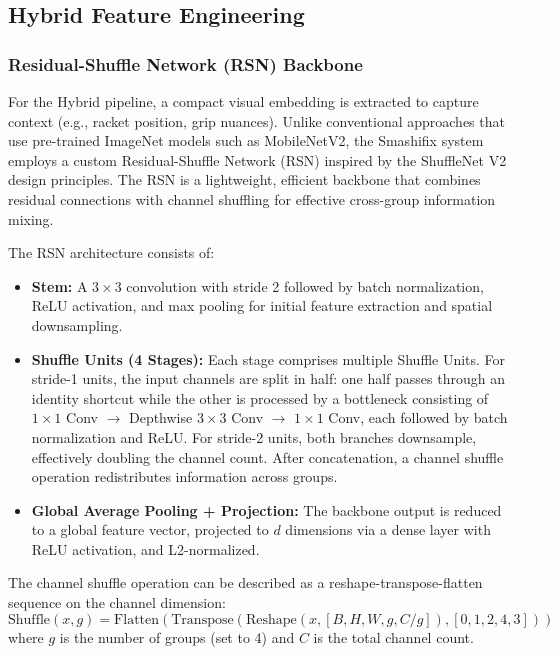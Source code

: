 \documentclass[pdflatex,sn-mathphys-num]{sn-jnl}%
\theoremstyle{thmstyleone}%
\theoremstyle{thmstyletwo}%
\theoremstyle{thmstylethree}%
\begin{document}
\subsection{Hybrid Feature Engineering}

\subsubsection{Residual-Shuffle Network (RSN) Backbone}
For the Hybrid pipeline, a compact visual embedding is extracted to capture context (e.g., racket position, grip nuances). Unlike conventional approaches that use pre-trained ImageNet models such as MobileNetV2, the Smashifix system employs a custom Residual-Shuffle Network (RSN) inspired by the ShuffleNet V2 \cite{b24} design principles. The RSN is a lightweight, efficient backbone that combines residual connections with channel shuffling for effective cross-group information mixing.

The RSN architecture consists of:
\begin{itemize}
    \item \textbf{Stem:} A $3 \times 3$ convolution with stride 2 followed by batch normalization, ReLU activation, and max pooling for initial feature extraction and spatial downsampling.
    \item \textbf{Shuffle Units (4 Stages):} Each stage comprises multiple Shuffle Units. For stride-1 units, the input channels are split in half: one half passes through an identity shortcut while the other is processed by a bottleneck consisting of $1 \times 1$ Conv $\rightarrow$ Depthwise $3 \times 3$ Conv $\rightarrow$ $1 \times 1$ Conv, each followed by batch normalization and ReLU. For stride-2 units, both branches downsample, effectively doubling the channel count. After concatenation, a channel shuffle operation redistributes information across groups.
    \item \textbf{Global Average Pooling + Projection:} The backbone output is reduced to a global feature vector, projected to $d$ dimensions via a dense layer with ReLU activation, and L2-normalized.
\end{itemize}

The channel shuffle operation can be described as a reshape-transpose-flatten sequence on the channel dimension:
\begin{equation}
\text{Shuffle}(x, g) = \text{Flatten}\left(\text{Transpose}\left(\text{Reshape}(x, [B, H, W, g, C/g]), [0,1,2,4,3]\right)\right)
\end{equation}
\noindent where $g$ is the number of groups (set to 4) and $C$ is the total channel count.
\end{document}
